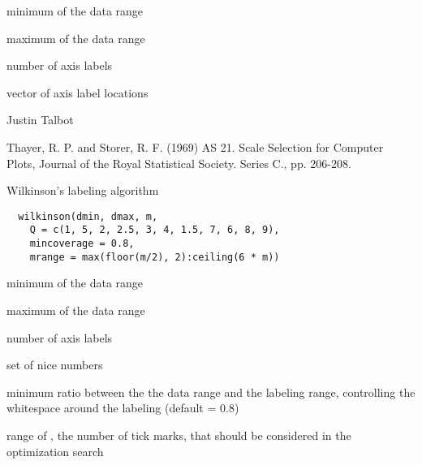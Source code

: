 \documentclass[letterpaper]{book}
\begin{document}
%
\begin{Arguments}
\begin{ldescription}
\item[\code{dmin}] minimum of the data range

\item[\code{dmax}] maximum of the data range

\item[\code{m}] number of axis labels
\end{ldescription}
\end{Arguments}
%
\begin{Value}
vector of axis label locations
\end{Value}
%
\begin{Author}\relax
Justin Talbot 
\end{Author}
%
\begin{References}\relax
Thayer, R. P. and Storer, R. F. (1969) AS 21. Scale
Selection for Computer Plots, Journal of the Royal
Statistical Society. Series C., pp. 206-208.
\end{References}
%
\begin{Description}\relax
Wilkinson's labeling algorithm
\end{Description}
%
\begin{Usage}
\begin{verbatim}
  wilkinson(dmin, dmax, m,
    Q = c(1, 5, 2, 2.5, 3, 4, 1.5, 7, 6, 8, 9),
    mincoverage = 0.8,
    mrange = max(floor(m/2), 2):ceiling(6 * m))
\end{verbatim}
\end{Usage}
%
\begin{Arguments}
\begin{ldescription}
\item[\code{dmin}] minimum of the data range

\item[\code{dmax}] maximum of the data range

\item[\code{m}] number of axis labels

\item[\code{Q}] set of nice numbers

\item[\code{mincoverage}] minimum ratio between the the data
range and the labeling range, controlling the whitespace
around the labeling (default = 0.8)

\item[\code{mrange}] range of , the number of tick
marks, that should be considered in the optimization
search
\end{ldescription}
\end{Arguments}
\end{document}
